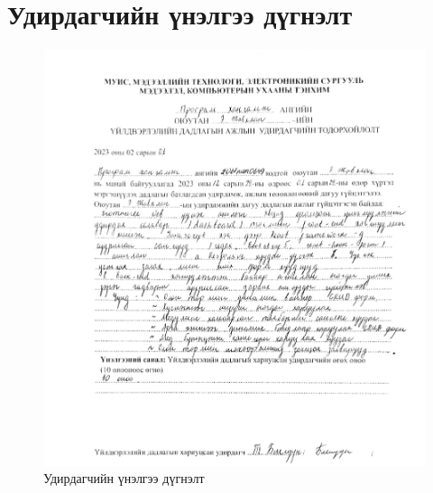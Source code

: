 \appendix
{}

\chapter{Удирдагчийн үнэлгээ дүгнэлт}
\begin{figure}[h]
   \centering
   \includegraphics[scale=0.23]{src/images/todorhoilolt.jpeg}
   \caption{Удирдагчийн үнэлгээ дүгнэлт}
\end{figure}
